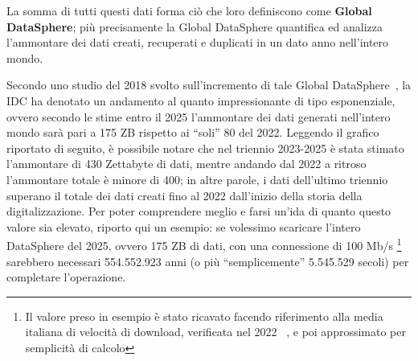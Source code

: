 La somma di tutti questi dati forma ciò che loro definiscono come \textbf{Global DataSphere}; più precisamente la Global DataSphere quantifica ed analizza l'ammontare dei dati creati, recuperati e duplicati in un dato anno nell'intero mondo.~\cite{datadrivendaily_dimension_table}

Secondo uno studio del 2018 svolto sull'incremento di tale Global DataSphere~\cite{idc_global_datasphere}, la IDC ha denotato un andamento al quanto impressionante di tipo esponenziale, ovvero secondo le stime entro il 2025 l'ammontare dei dati generati nell'intero mondo sarà pari a 175 ZB rispetto ai “soli” 80 del 2022. Leggendo il grafico riportato di seguito, è possibile notare che nel triennio 2023-2025 è stata stimato l'ammontare di 430 Zettabyte di dati, mentre andando dal 2022 a ritroso l'ammontare totale è minore di 400; in altre parole, i dati dell'ultimo triennio superano il totale dei dati creati fino al 2022 dall'inizio della storia della digitalizzazione. Per poter comprendere meglio e farsi un'ida di quanto questo valore sia elevato, riporto qui un esempio: se volessimo scaricare l'intero DataSphere del 2025, ovvero 175 ZB di dati, con una connessione di 100 Mb/s \footnote{Il valore preso in esempio è stato ricavato facendo riferimento alla media italiana di velocità di download, verificata nel 2022 ~\cite{github_speed_connection}, e poi approssimato per semplicità di calcolo} sarebbero necessari 554.552.923 anni (o più “semplicemente” 5.545.529 secoli) per completare l'operazione.


